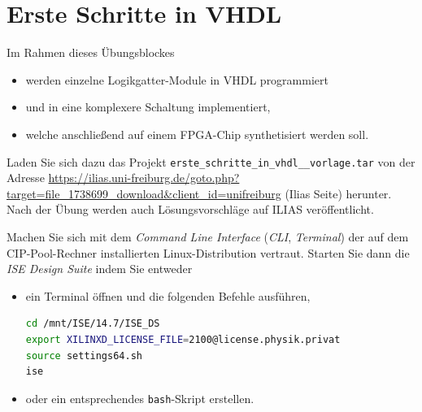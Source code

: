 \documentclass[12pt]{article}
\begin{document}




\part*{Erste Schritte in VHDL}


Im Rahmen dieses Übungsblockes
\vspace*{-5pt}
\begin{itemize}
    \setlength\itemsep{-5pt}
    \item werden einzelne Logikgatter-Module in VHDL programmiert
    \item und in eine komplexere Schaltung implementiert,
    \item welche anschließend auf einem FPGA-Chip synthetisiert werden soll.
\end{itemize}


Laden Sie sich dazu das Projekt
\texttt{erste\_schritte\_in\_vhdl\_\_vorlage.tar}
von der Adresse \url{https://ilias.uni-freiburg.de/goto.php?target=file_1738699_download&client_id=unifreiburg} (Ilias Seite)  herunter.
Nach der Übung werden auch Lösungsvorschläge auf ILIAS veröffentlicht.







Machen Sie sich mit dem \textit{Command Line Interface} (\textit{CLI}, \textit{Terminal}) der auf dem CIP-Pool-Rechner installierten Linux-Distribution vertraut. Starten Sie dann die \textit{ISE Design Suite} indem Sie entweder


\begin{itemize}
\setlength\itemsep{-25pt}


\item ein Terminal öffnen und die folgenden Befehle ausführen,
\begin{lstlisting}[language=bash]
cd /mnt/ISE/14.7/ISE_DS
export XILINXD_LICENSE_FILE=2100@license.physik.privat
source settings64.sh
ise
\end{lstlisting}
\vspace*{-1mm}


\item oder ein entsprechendes \texttt{bash}-Skript erstellen.


\end{itemize}
\end{document}
